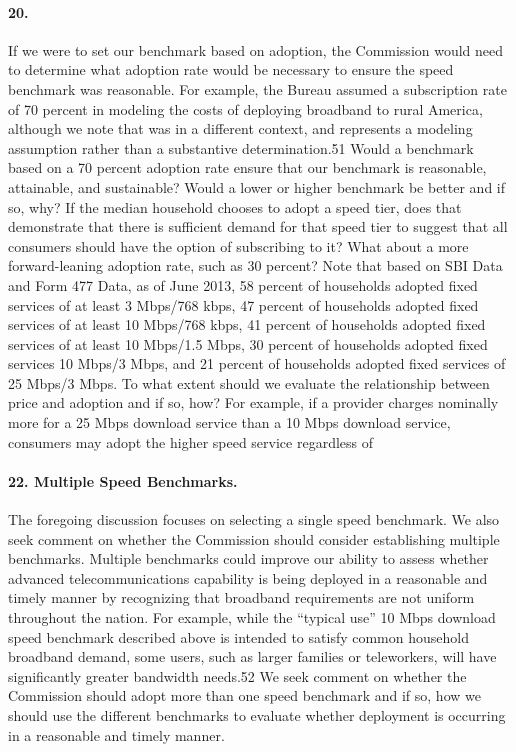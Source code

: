 \paragraph{20. } If we were to set our benchmark based on adoption, the Commission would need to
determine what adoption rate would be necessary to ensure the speed benchmark was reasonable. For example, the Bureau assumed a subscription rate of 70 percent in modeling the costs of deploying broadband to rural America, although we note that was in a different context, and represents a modeling assumption rather than a substantive determination.51
Would a benchmark based on a 70 percent adoption
rate ensure that our benchmark is reasonable, attainable, and sustainable? Would a lower or higher benchmark be better and if so, why? If the median household chooses to adopt a speed tier, does that demonstrate that there is sufficient demand for that speed tier to suggest that all consumers should have the option of subscribing to it? What about a more forward-leaning adoption rate, such as 30 percent? Note that based on SBI Data and Form 477 Data, as of June 2013, 58 percent of households adopted fixed services of at least 3 Mbps/768 kbps, 47 percent of households adopted fixed services of at least 10 Mbps/768 kbps, 41 percent of households adopted fixed services of at least 10 Mbps/1.5 Mbps, 30 percent of households adopted fixed services 10 Mbps/3 Mbps, and 21 percent of households adopted fixed services of 25 Mbps/3 Mbps. To what extent should we evaluate the relationship between price and adoption and if so, how? For example, if a provider charges nominally more for a 25 Mbps download service than a 10 Mbps download service, consumers may adopt the higher speed service regardless of

\paragraph{22. Multiple Speed Benchmarks.}  The foregoing discussion focuses on selecting a single
speed benchmark. We also seek comment on whether the Commission should consider establishing multiple benchmarks. Multiple benchmarks could improve our ability to assess whether advanced telecommunications capability is being deployed in a reasonable and timely manner by recognizing that broadband requirements are not uniform throughout the nation. For example, while the ``typical use'' 10 Mbps download speed benchmark described above is intended to satisfy common household broadband demand, some users, such as larger families or teleworkers, will have significantly greater bandwidth needs.52
We seek comment on whether the Commission should adopt more than one speed benchmark and if so, how we should use the different benchmarks to evaluate whether deployment is occurring in a reasonable and timely manner.

